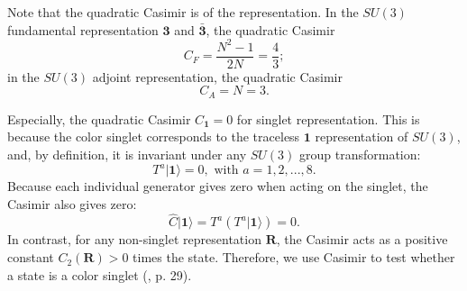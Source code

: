 \documentclass[12pt]{article}
\begin{document}
	Note that the quadratic Casimir is of the representation. In the $SU(3)$ fundamental representation $\mathbf{3}$ and $\mathbf{\bar 3}$, the quadratic Casimir
	\begin{equation}
		C_F = \frac{N^2-1}{2N} = \frac{4}{3};
	\end{equation}
	in the $SU(3)$ adjoint representation, the quadratic Casimir
	\begin{equation}
		C_A = N = 3. 
	\end{equation}
	
	
	
	Especially, the quadratic Casimir $C_\mathbf{1} = 0$ for singlet representation. This is because the color singlet corresponds to the traceless $\mathbf{1}$ representation of $SU(3)$, 
	and, by definition, it is invariant under any $SU(3)$ group transformation:
	\begin{equation}
		T^a |\mathbf{1}\rangle = 0, \text{ with } a = 1,2,...,8.
	\end{equation}
	Because each individual generator gives zero when acting on the singlet, the Casimir also gives zero:
	\begin{equation}
		\hat{C}|\mathbf{1}\rangle 
		= T^a \left(T^a |\mathbf{1}\rangle\right)  
		= 0.
	\end{equation}
	In contrast, for any non-singlet representation $\mathbf{R}$, the Casimir acts as a positive constant $C_2(\mathbf{R}) > 0$ times the state. Therefore, we use Casimir to test whether a state is a color singlet (\cite{Lijun1}, p. 29).
	
\end{document}
